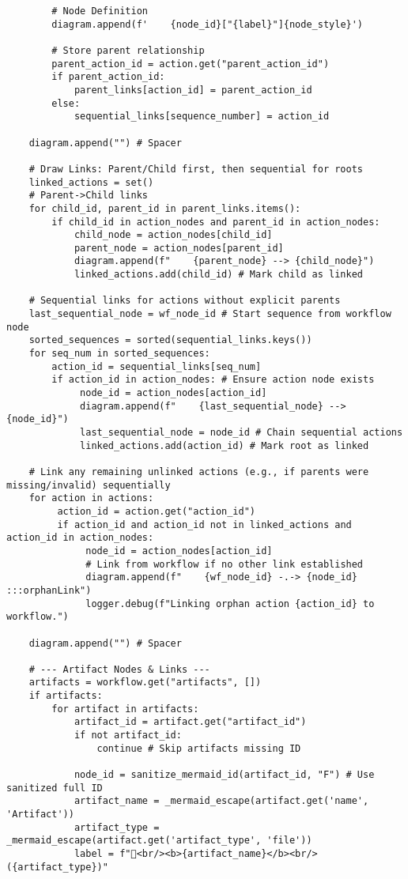 \documentclass[12pt,a4paper]{article}
\begin{document}
\begin{pageablecode}
\begin{verbatim}
        # Node Definition
        diagram.append(f'    {node_id}["{label}"]{node_style}')

        # Store parent relationship
        parent_action_id = action.get("parent_action_id")
        if parent_action_id:
            parent_links[action_id] = parent_action_id
        else:
            sequential_links[sequence_number] = action_id

    diagram.append("") # Spacer

    # Draw Links: Parent/Child first, then sequential for roots
    linked_actions = set()
    # Parent->Child links
    for child_id, parent_id in parent_links.items():
        if child_id in action_nodes and parent_id in action_nodes:
            child_node = action_nodes[child_id]
            parent_node = action_nodes[parent_id]
            diagram.append(f"    {parent_node} --> {child_node}")
            linked_actions.add(child_id) # Mark child as linked

    # Sequential links for actions without explicit parents
    last_sequential_node = wf_node_id # Start sequence from workflow node
    sorted_sequences = sorted(sequential_links.keys())
    for seq_num in sorted_sequences:
        action_id = sequential_links[seq_num]
        if action_id in action_nodes: # Ensure action node exists
             node_id = action_nodes[action_id]
             diagram.append(f"    {last_sequential_node} --> {node_id}")
             last_sequential_node = node_id # Chain sequential actions
             linked_actions.add(action_id) # Mark root as linked

    # Link any remaining unlinked actions (e.g., if parents were missing/invalid) sequentially
    for action in actions:
         action_id = action.get("action_id")
         if action_id and action_id not in linked_actions and action_id in action_nodes:
              node_id = action_nodes[action_id]
              # Link from workflow if no other link established
              diagram.append(f"    {wf_node_id} -.-> {node_id} :::orphanLink")
              logger.debug(f"Linking orphan action {action_id} to workflow.")

    diagram.append("") # Spacer

    # --- Artifact Nodes & Links ---
    artifacts = workflow.get("artifacts", [])
    if artifacts:
        for artifact in artifacts:
            artifact_id = artifact.get("artifact_id")
            if not artifact_id: 
                continue # Skip artifacts missing ID

            node_id = sanitize_mermaid_id(artifact_id, "F") # Use sanitized full ID
            artifact_name = _mermaid_escape(artifact.get('name', 'Artifact'))
            artifact_type = _mermaid_escape(artifact.get('artifact_type', 'file'))
            label = f"📄<br/><b>{artifact_name}</b><br/>({artifact_type})"


\end{verbatim}
\end{pageablecode}
\end{document}
